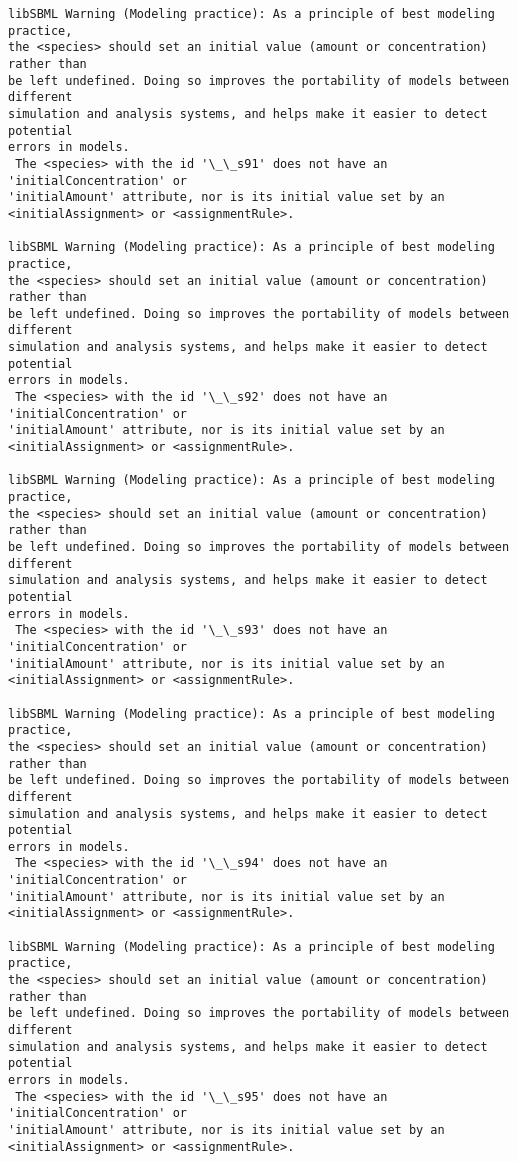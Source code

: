 \documentclass[11pt]{article}
\begin{document}
\begin{Verbatim}[commandchars=\\\{\}]
libSBML Warning (Modeling practice): As a principle of best modeling practice,
the <species> should set an initial value (amount or concentration) rather than
be left undefined. Doing so improves the portability of models between different
simulation and analysis systems, and helps make it easier to detect potential
errors in models.
 The <species> with the id '\_\_s91' does not have an 'initialConcentration' or
'initialAmount' attribute, nor is its initial value set by an
<initialAssignment> or <assignmentRule>.

libSBML Warning (Modeling practice): As a principle of best modeling practice,
the <species> should set an initial value (amount or concentration) rather than
be left undefined. Doing so improves the portability of models between different
simulation and analysis systems, and helps make it easier to detect potential
errors in models.
 The <species> with the id '\_\_s92' does not have an 'initialConcentration' or
'initialAmount' attribute, nor is its initial value set by an
<initialAssignment> or <assignmentRule>.

libSBML Warning (Modeling practice): As a principle of best modeling practice,
the <species> should set an initial value (amount or concentration) rather than
be left undefined. Doing so improves the portability of models between different
simulation and analysis systems, and helps make it easier to detect potential
errors in models.
 The <species> with the id '\_\_s93' does not have an 'initialConcentration' or
'initialAmount' attribute, nor is its initial value set by an
<initialAssignment> or <assignmentRule>.

libSBML Warning (Modeling practice): As a principle of best modeling practice,
the <species> should set an initial value (amount or concentration) rather than
be left undefined. Doing so improves the portability of models between different
simulation and analysis systems, and helps make it easier to detect potential
errors in models.
 The <species> with the id '\_\_s94' does not have an 'initialConcentration' or
'initialAmount' attribute, nor is its initial value set by an
<initialAssignment> or <assignmentRule>.

libSBML Warning (Modeling practice): As a principle of best modeling practice,
the <species> should set an initial value (amount or concentration) rather than
be left undefined. Doing so improves the portability of models between different
simulation and analysis systems, and helps make it easier to detect potential
errors in models.
 The <species> with the id '\_\_s95' does not have an 'initialConcentration' or
'initialAmount' attribute, nor is its initial value set by an
<initialAssignment> or <assignmentRule>.


\end{Verbatim}
\end{document}
